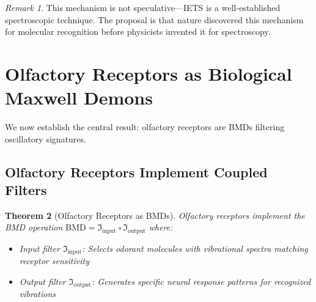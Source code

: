 \documentclass[11pt]{article}
\newtheorem{theorem}{Theorem}[section]
\theoremstyle{remark}
\newtheorem{remark}[theorem]{Remark}
\begin{document}
\begin{remark}
This mechanism is not speculative—IETS is a well-established spectroscopic technique. The proposal is that nature discovered this mechanism for molecular recognition before physicists invented it for spectroscopy.
\end{remark}

\section{Olfactory Receptors as Biological Maxwell Demons}

We now establish the central result: olfactory receptors are BMDs filtering oscillatory signatures.

\subsection{Olfactory Receptors Implement Coupled Filters}

\begin{theorem}[Olfactory Receptors as BMDs]
\label{thm:olfactory_bmd}
Olfactory receptors implement the BMD operation $\text{BMD} = \Im_{\text{input}} \circ \Im_{\text{output}}$ where:
\begin{itemize}
\item Input filter $\Im_{\text{input}}$: Selects odorant molecules with vibrational spectra matching receptor sensitivity
\item Output filter $\Im_{\text{output}}$: Generates specific neural response patterns for recognized vibrations
\end{itemize}
\end{theorem}
\end{document}
